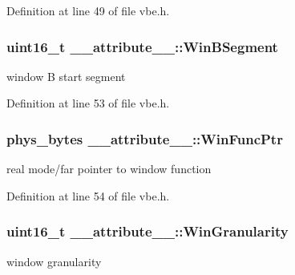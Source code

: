 Definition at line 49 of file vbe.\+h.

\hypertarget{struct____attribute_____a6dbaac9ee1cae36ca0c7b46559264b69}{}
\subsubsection[{Win\+B\+Segment}]{\setlength{\rightskip}{0pt plus 5cm}uint16\+\_\+t \+\_\+\+\_\+attribute\+\_\+\+\_\+\+::\+Win\+B\+Segment}\label{struct____attribute_____a6dbaac9ee1cae36ca0c7b46559264b69}


window B start segment 



Definition at line 53 of file vbe.\+h.

\hypertarget{struct____attribute_____aa211c2411f48f899b0bb0739ecef0b37}{}
\subsubsection[{Win\+Func\+Ptr}]{\setlength{\rightskip}{0pt plus 5cm}phys\+\_\+bytes \+\_\+\+\_\+attribute\+\_\+\+\_\+\+::\+Win\+Func\+Ptr}\label{struct____attribute_____aa211c2411f48f899b0bb0739ecef0b37}


real mode/far pointer to window function 



Definition at line 54 of file vbe.\+h.

\hypertarget{struct____attribute_____acc2114dbf039909e55cc3966abd3358d}{}
\subsubsection[{Win\+Granularity}]{\setlength{\rightskip}{0pt plus 5cm}uint16\+\_\+t \+\_\+\+\_\+attribute\+\_\+\+\_\+\+::\+Win\+Granularity}\label{struct____attribute_____acc2114dbf039909e55cc3966abd3358d}


window granularity 



